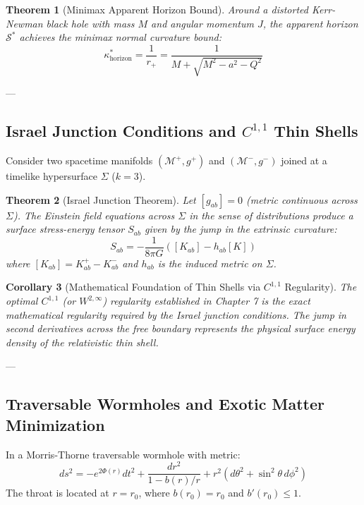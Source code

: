 \documentclass[11pt,reqno]{amsart}
\newtheorem{theorem}{Theorem}[section]
\newtheorem{corollary}[theorem]{Corollary}
\theoremstyle{definition}
\numberwithin{equation}{section}
\begin{document}
\begin{theorem}[Minimax Apparent Horizon Bound]
Around a distorted Kerr-Newman black hole with mass $M$ and angular momentum $J$, the apparent horizon $\mathcal{S}^*$ achieves the minimax normal curvature bound:
\begin{equation}
\kappa^*_{\text{horizon}} = \frac{1}{r_+} = \frac{1}{M + \sqrt{M^2 - a^2 - Q^2}}
\end{equation}
\end{theorem}

---

\subsection{Israel Junction Conditions and \texorpdfstring{$C^{1,1}$}{C\textasciicircum(1,1)} Thin Shells}
Consider two spacetime manifolds $(\mathcal{M}^+, g^+)$ and $(\mathcal{M}^-, g^-)$ joined at a timelike hypersurface $\Sigma$ ($k=3$).

\begin{theorem}[Israel Junction Theorem]
Let $[g_{ab}] = 0$ (metric continuous across $\Sigma$). The Einstein field equations across $\Sigma$ in the sense of distributions produce a surface stress-energy tensor $S_{ab}$ given by the jump in the extrinsic curvature:
\begin{equation}
\label{eq:israel}
S_{ab} = -\frac{1}{8\pi G} \left( [K_{ab}] - h_{ab} [K] \right)
\end{equation}
where $[K_{ab}] = K_{ab}^+ - K_{ab}^-$ and $h_{ab}$ is the induced metric on $\Sigma$.
\end{theorem}

\begin{corollary}[Mathematical Foundation of Thin Shells via $C^{1,1}$ Regularity]
The optimal $C^{1,1}$ (or $W^{2,\infty}$) regularity established in Chapter 7 \cite{silvafilho2026minimax} is the exact mathematical regularity required by the Israel junction conditions. The jump in second derivatives across the free boundary represents the physical surface energy density of the relativistic thin shell.
\end{corollary}

---

\subsection{Traversable Wormholes and Exotic Matter Minimization}
In a Morris-Thorne traversable wormhole with metric:
\begin{equation}
ds^2 = -e^{2\Phi(r)} dt^2 + \frac{dr^2}{1 - b(r)/r} + r^2 (d\theta^2 + \sin^2\theta \, d\phi^2)
\end{equation}
The throat is located at $r = r_0$, where $b(r_0) = r_0$ and $b'(r_0) \le 1$.
\end{document}
